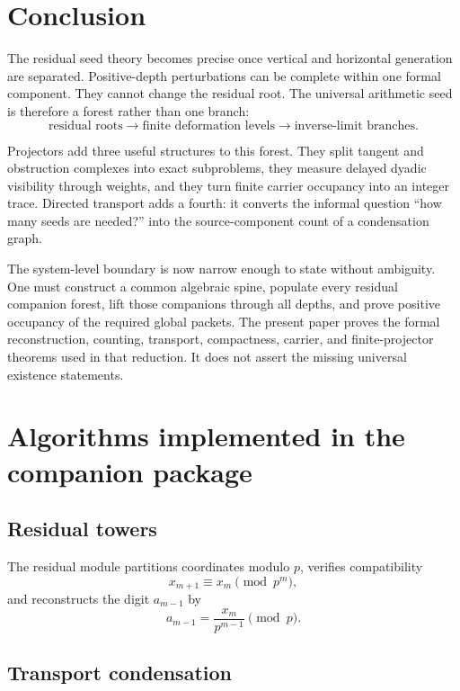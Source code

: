 \documentclass[11pt]{article}
\theoremstyle{definition}
\theoremstyle{remark}
\begin{document}
\section{Conclusion}

The residual seed theory becomes precise once vertical and horizontal generation are separated.  Positive-depth perturbations can be complete within one formal component.  They cannot change the residual root.  The universal arithmetic seed is therefore a forest rather than one branch:
\[
\boxed{
\text{residual roots}
\longrightarrow
\text{finite deformation levels}
\longrightarrow
\text{inverse-limit branches}.
}
\]

Projectors add three useful structures to this forest.  They split tangent and obstruction complexes into exact subproblems, they measure delayed dyadic visibility through weights, and they turn finite carrier occupancy into an integer trace.  Directed transport adds a fourth: it converts the informal question ``how many seeds are needed?'' into the source-component count of a condensation graph.

The system-level boundary is now narrow enough to state without ambiguity.  One must construct a common algebraic spine, populate every residual companion forest, lift those companions through all depths, and prove positive occupancy of the required global packets.  The present paper proves the formal reconstruction, counting, transport, compactness, carrier, and finite-projector theorems used in that reduction.  It does not assert the missing universal existence statements.

\appendix

\section{Algorithms implemented in the companion package}

\subsection{Residual towers}

The residual module partitions coordinates modulo \(p\), verifies compatibility
\[
x_{m+1}\equiv x_m\pmod{p^m},
\]
and reconstructs the digit \(a_{m-1}\) by
\[
a_{m-1}=\frac{x_m}{p^{m-1}}\pmod p.
\]

\subsection{Transport condensation}
\end{document}
